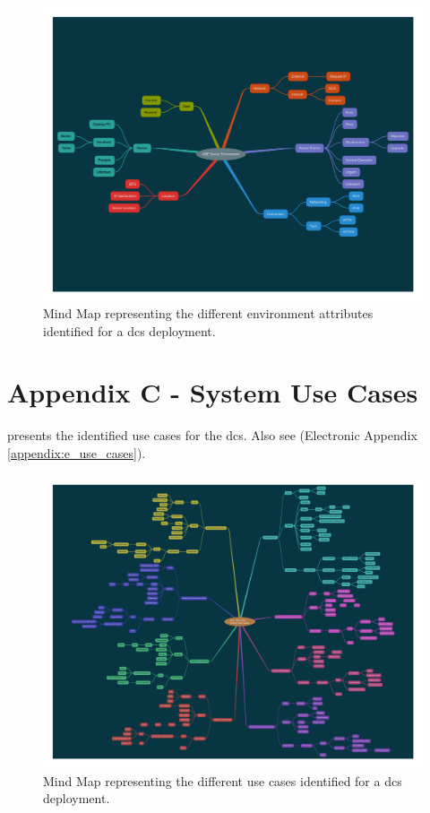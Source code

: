 \begin{appendices}
\begin{figure}[htp]
    \centering
    \label{fig:appendix_environments}
    \includegraphics[width=\linewidth]{appendices/mind_maps/ABE_Environments_slides_Oct26.pdf}
    \caption{Mind Map representing the different environment attributes identified for a \acrshort{dcs} deployment.}
\end{figure}

\section{Appendix C - System Use Cases}
\label{appendix:use_cases}

 presents the identified use cases for the \acrfull{dcs}. Also see (Electronic Appendix \ref{appendix:e_use_cases}).

\begin{figure}[htp]
    \centering
    \label{fig:appendix_use_cases}
    \includegraphics[width=\linewidth]{appendices/mind_maps/ABE_Use_Cases_slides_Oct26.pdf}
    \caption{Mind Map representing the different use cases identified for a \acrshort{dcs} deployment.}
\end{figure}


\end{appendices}
